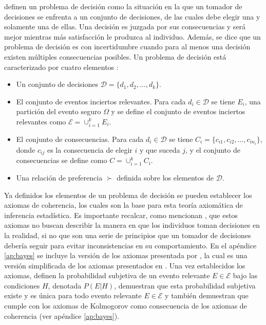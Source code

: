 \documentclass[11pt,a4paper]{article}
\begin{document}
\citet{mendoza} definen un problema de decisión como la situación en la que un tomador de decisiones se enfrenta a un conjunto de decisiones, 	de las cuales debe elegir una y solamente una de ellas. Una decisión es juzgada por sus consecuencias y será mejor mientras más satisfacción le produzca al individuo. Además, se dice que un problema de decisión es con incertidumbre cuando para al menos una decisión existen múltiples consecuencias posibles. Un problema de decisión está caracterizado por cuatro elementos \citep{mendoza}:
\begin{itemize}
\item Un conjunto de decisiones $\mathcal{D} = \lbrace d_1, d_2, \dots, d_k\rbrace$.
\item El conjunto de eventos inciertos relevantes. Para cada $d_i \in \mathcal{D}$ se tiene $E_i$, una partición del evento seguro $\Omega$ y se define el conjunto de eventos inciertos relevantes como $\mathcal{E} = \cup_{i=1}^k E_i$.
\item El conjunto de consecuencias. Para cada $d_i \in \mathcal{D}$ se tiene $C_i = \lbrace c_{i1}, c_{i2}, \dots, c_{in_i}\rbrace$, donde $c_{ij}$ es la consecuencia de elegir $i$ y que suceda $j$, y el conjunto de consecuencias se define como $C = \cup_{i=1}^k C_i$.
\item Una relación de preferencia $\succ$ definida sobre los elementos de $\mathcal{D}$.
\end{itemize}

Ya definidos los elementos de un problema de decisión se pueden establecer los axiomas de coherencia, los cuales son la base para esta teoría axiomática de inferencia estadística. Es importante recalcar, como mencionan \citet{bernardo}, que estos axiomas no buscan describir la manera en que los individuos toman decisiones en la realidad, si no que son una serie de principios que un tomador de decisiones debería seguir para evitar inconsistencias en su comportamiento. En el apéndice \ref{ap:bayes} se incluye la versión de los axiomas presentada por \citet{mendoza}, la cual es una versión simplificada de los axiomas presentados en \citet{bernardo}. Una vez establecidos los axiomas, \citet{mendoza} definen la probabilidad subjetiva de un evento relevante $E \in \mathcal{E}$ bajo las condiciones $H$, denotada $P(E|H)$, demuestran que esta probabilidad subjetiva existe y es única para todo evento relevante $E \in \mathcal{E}$ y también demuestran que cumple con los axiomas de Kolmogorov como consecuencia de los axiomas de coherencia (ver apéndice \ref{ap:bayes}).
\end{document}
